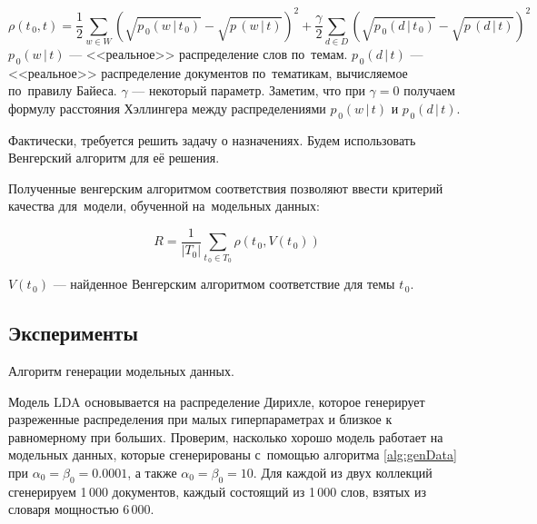 \documentclass[12pt]{article}
\begin{document}
\begin{equation}
\label{frm:distance}
  \rho(t_{\,0},t) = 
    \frac12\sum_{w\in W}\left(
      \sqrt{p_{\,0}(w\,|\,t_{\,0})} - \sqrt{p\,(w\,|\,t)}
    \right)^2 + 
    \frac\gamma2\!\sum_{d\in D}\left(
      \sqrt{p_{\,0}(d\,|\,t_{\,0})} - \sqrt{p\,(d\,|\,t)}
    \right)^2
\end{equation}
$\displaystyle p_{\,0}(w\,|\,t) $ --- <<реальное>> распределение слов по~темам. \newline
$\displaystyle p_{\,0}(d\,|\,t) $ --- <<реальное>> распределение документов по~тематикам, вычисляемое по~правилу Байеса.\newline
$\displaystyle \gamma $ --- некоторый параметр. 
Заметим, что при $ \gamma = 0 $ получаем формулу расстояния Хэллингера между распределениями $ p_{\,0}(w\,|\,t) $ и $ p_{\,0}(d\,|\,t) $.

Фактически, требуется решить задачу о назначениях.
Будем использовать Венгерский алгоритм для её решения.

Полученные венгерским алгоритмом соответствия позволяют ввести критерий качества для~модели, обученной на~модельных данных:

\[
R = \frac1{|T_0|} \sum_{t_{\,0}\in T_0} \rho(t_{\,0},V(t_{\,0}))
\]

$\displaystyle V(t_{\,0}) $ --- найденное Венгерским алгоритмом соответствие для темы $ t_{\,0} $.

\subsection{Эксперименты}

\begin{algorithm}
\label{alg:genData}
\caption{Алгоритм генерации модельных данных.}
\DontPrintSemicolon


\end{algorithm}


Модель LDA основывается на распределение Дирихле, которое генерирует разреженные распределения при малых гиперпараметрах и близкое к равномерному при больших.
Проверим, насколько хорошо модель работает на модельных данных, которые сгенерированы с~помощью алгоритма \ref{alg:genData} при $ \alpha_0 = \beta_0 = 0.0001 $, а также $ \alpha_0 = \beta_0 = 10 $.
Для каждой из двух коллекций сгенерируем 1\,000 документов, каждый состоящий из 1\,000 слов, взятых из словаря мощностью 6\,000.
\end{document}
